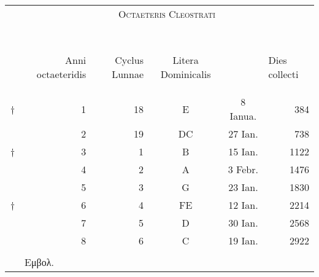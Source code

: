 %
\begin{tabular}[t]{r rrccr}
~ & \multicolumn{5}{c}{\textsc{Octaeteris Cleostrati}}\\
\\ %
\\
\\
\\
\\
~ &
\begin{rotate}{60}Anni octaeteridis\end{rotate} &
\begin{rotate}{60}Cyclus Lunnae\end{rotate} &
\begin{rotate}{60}Litera Dominicalis\end{rotate} &
~ &
\multicolumn{1}{l}{\begin{rotate}{60}Dies collecti\end{rotate}}
\\
\cline{2-6}
\scriptsize{†}
  &  1 & 18 &  E &  8 Ianua. &  384 \\
~ &  2 & 19 & DC & 27 Ian.   &  738 \\
\footnotesize{†}
  &  3 &  1 &  B & 15 Ian.   & 1122 \\
~ &  4 &  2 &  A &  3 Febr.  & 1476 \\
~ &  5 &  3 &  G & 23 Ian.   & 1830 \\
\footnotesize{†}
  &  6 &  4 & FE & 12 Ian.   & 2214 \\
~ &  7 &  5 &  D & 30 Ian.   & 2568 \\
~ &  8 &  6 &  C & 19 Ian.   & 2922 \\
\\
~ & \multicolumn{5}{l}{\footnotesize \super{†} \textgreek{Εμβολ.}}\\
\end{tabular}
%
